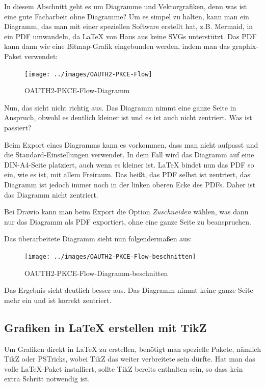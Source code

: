 In diesem Abschnitt geht es um Diagramme und Vektorgrafiken, denn was ist eine gute Facharbeit ohne Diagramme? Um es simpel zu halten, kann man ein Diagramm, das man mit einer speziellen Software erstellt hat, z.B. Mermaid, in ein PDF umwandeln, da LaTeX von Haus aus keine SVGs unterstützt. Das PDF kann dann wie eine Bitmap-Grafik eingebunden werden, indem man das graphix-Paket verwendet:

\begin{figure}[H]
	\centering
	\texttt{[image: ../images/OAUTH2-PKCE-Flow]}
	\caption{OAUTH2-PKCE-Flow-Diagramm}
	\label{fig:oauth2-pkce-flog-diagramm}
\end{figure}

Nun, das sieht nicht richtig aus. Das Diagramm nimmt eine ganze Seite in Anspruch, obwohl es deutlich kleiner ist und es ist auch nicht zentriert. Was ist passiert?

Beim Export eines Diagramms kann es vorkommen, dass man nicht aufpasst und die Standard-Einstellungen verwendet. In dem Fall wird das Diagramm auf eine DIN-A4-Seite platziert, auch wenn es kleiner ist. LaTeX bindet nun das PDF so ein, wie es ist, mit allem Freiraum. Das heißt, das PDF selbst ist zentriert, das Diagramm ist jedoch immer noch in der linken oberen Ecke des PDFs. Daher ist das Diagramm nicht zentriert.

Bei Drawio kann man beim Export die Option \textit{Zuschneiden} wählen, was dann nur das Diagramm als PDF exportiert, ohne eine ganze Seite zu beanspruchen.

Das überarbeitete Diagramm sieht nun folgendermaßen aus:

\begin{figure}[H]
	\centering
	\texttt{[image: ../images/OAUTH2-PKCE-Flow-beschnitten]}
	\caption{OAUTH2-PKCE-Flow-Diagramm-beschnitten}
	\label{fig:oauth2-pkce-flog-diagramm-beschnitten}
\end{figure}

Das Ergebnis sieht deutlich besser aus. Das Diagramm nimmt keine ganze Seite mehr ein und ist korrekt zentriert.

\newpage

\subsection{Grafiken in LaTeX erstellen mit TikZ}

Um Grafiken direkt in LaTeX zu erstellen, benötigt man spezielle Pakete, nämlich TikZ oder PSTricks, wobei TikZ das weiter verbreitete sein dürfte. Hat man das volle LaTeX-Paket installiert, sollte TikZ bereits enthalten sein, so dass kein extra Schritt notwendig ist.

